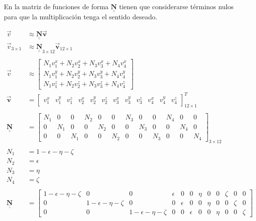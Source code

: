 \documentclass[12pt]{article}
\def\doubleunderline#1{\underline{\underline{#1}}}
\newcommand{\vv}{\vec{v}}
\newcommand{\vb}{\vec{\mathbf{v}}}
\newcommand{\nb}{\doubleunderline{\mathbf{N}}}
\begin{document}
En la matriz de funciones de forma $\nb$ tienen que considerarse t\'erminos nulos para que la multiplicaci\'on tenga el sentido deseado.

\begin{align*}
\vv &\approx \nb \vb \\
\vv_{3 \times 1} & \approx \nb_{3 \times 12} \vb_{12 \times 1}
\\ \\
\vv &\approx	\begin{bmatrix} 
	N_1v^{x}_{1} +  N_2v^{x}_{2} +  N_3v^{x}_{3} +  N_4v^{x}_{4} \\
	N_1v^{y}_{1} +  N_2v^{y}_{2} +  N_3v^{y}_{3} +  N_4v^{y}_{4} \\
	N_1v^{z}_{1} +  N_2v^{z}_{2} +  N_3v^{z}_{3} +  N_4v^{z}_{4}
 \end{bmatrix}
\\
\vb & =
\begin{bmatrix}
	v_{1}^{x} & v_{1}^{y} & v_{1}^{z} &  v_{2}^{x} & v_{2}^{y} & v_{2}^{z} &  v_{3}^{x} & v_{3}^{y} & v_{3}^{z} &  v_{4}^{x} & v_{4}^{y} & v_{4}^{z}
\end{bmatrix}^{T}_{12 \times 1}
\\ \\
\nb &=
\begin{bmatrix}
	N_1 & 0 & 0 &  N_2 & 0 & 0 &  N_3 & 0 & 0 &  N_4 & 0 & 0 \\
	0 & N_1 & 0 & 0 &  N_2 & 0 & 0 &  N_3 & 0 & 0 &  N_4 & 0 \\
	0 & 0 & N_1 & 0 & 0 &  N_2 & 0 & 0 &  N_3 & 0 & 0 &  N_4
\end{bmatrix}_{3 \times 12} \\
\\
N_1 &= 1 - \epsilon - \eta - \zeta \\
N_2 &= \epsilon \\
N_3 &= \eta \\
N_4 &= \zeta \\
\\
\nb &=
\begin{bmatrix}
	1 - \epsilon - \eta - \zeta & 0 & 0 &  \epsilon & 0 & 0 &  \eta & 0 & 0 &  \zeta & 0 & 0 \\
	0 & 1 - \epsilon - \eta - \zeta & 0 & 0 &  \epsilon & 0 & 0 &  \eta & 0 & 0 &  \zeta & 0 \\
	0 & 0 & 1 - \epsilon - \eta - \zeta & 0 & 0 &  \epsilon & 0 & 0 &  \eta & 0 & 0 &  \zeta
\end{bmatrix}
\end{align*}
\end{document}

